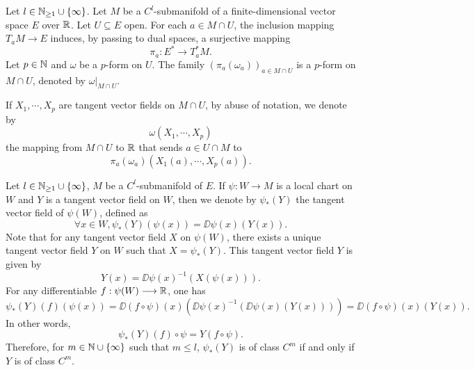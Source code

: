 \begin{exampleenv}[Definition]
\begin{figure}[H]
    \end{figure}
\end{exampleenv}

\begin{exampleenv}
    Let $l \in \mathbb{N}_{\ge 1} \cup \{\infty\}$.
    Let $M$ be a $C^l$-submanifold of a finite-dimensional vector space $E$ over $\mathbb{R}$.
    Let $U \subseteq E$ open.
    For each $a \in M \cap U$, the inclusion mapping $T_aM \longrightarrow E$ induces, by passing to dual spaces, a surjective mapping
    $$\pi_a : E^* \longrightarrow T_a^* M.$$
    Let $p \in \mathbb{N}$ and $\omega$ be a $p$-form on $U$.
    The family $(\pi_a (\omega_a))_{a \in M \cap U}$ is a $p$-form on $M \cap U$, denoted by $\omega|_{M \cap U}$.

    \quad If $X_1,\cdots,X_p$ are tangent vector fields on $M \cap U$, by abuse of notation, we denote by 
    $$\omega(X_1,\cdots, X_p)$$
    the mapping from $M \cap U$ to $\mathbb{R}$ that sends $a \in U \cap M$ to
    $$\pi_a (\omega_a)(X_1(a),\cdots,X_p(a)).$$
\end{exampleenv}

\begin{definitionenv}
    Let $l \in \mathbb{N}_{\ge 1} \cup \{\infty\}$, $M$ be a $C^l$-submanifold of $E$.
    If $\psi : W \longrightarrow M$ is a local chart on $W$ and $Y$ is a tangent vector field on $W$, then we denote by $\psi_* (Y)$ the tangent vector field of $\psi(W)$, defined as
    $$\forall x \in W, \psi_* (Y)(\psi(x)) = \DD \psi(x) (Y(x)).$$
    Note that for any tangent vector field $X$ on $\psi(W)$, there exists a unique tangent vector field $Y$ on $W$ such that $X = \psi_*(Y)$.
    This tangent vector field $Y$ is given by
    $$Y(x) = \DD \psi (x)^{-1} (X(\psi(x))).$$
    For any differentiable $f : \psi(W) \longrightarrow \mathbb{R}$, one has
    $$\psi_*(Y)(f)(\psi(x)) = \DD (f \circ \psi)(x)(\DD \psi(x)^{-1}(\DD \psi(x) (Y(x)))) = \DD (f \circ \psi)(x) (Y(x)).$$
    In other words,
    $$\psi_*(Y)(f) \circ \psi = Y (f \circ \psi).$$
    Therefore, for $m \in \mathbb{N} \cup \{\infty\}$ such that $m \le l$, $\psi_*(Y)$ is of class $C^m$ if and only if $Y$ is of class $C^m$.
\end{definitionenv}

